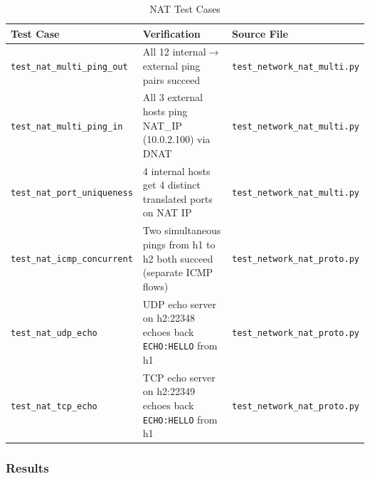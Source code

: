 \documentclass[12pt,a4paper]{article}
\begin{document}
\begin{table}[H]
\centering
\begin{tabular}{@{}p{5cm}p{4.5cm}p{4cm}@{}}
\toprule
\textbf{Test Case} & \textbf{Verification} & \textbf{Source File} \\
\midrule
\texttt{test\_nat\_multi\_ping\_out} & All 12 internal$\rightarrow$external ping pairs succeed & \texttt{test\_network\_nat\_multi.py} \\
\texttt{test\_nat\_multi\_ping\_in} & All 3 external hosts ping NAT_IP (10.0.2.100) via DNAT & \texttt{test\_network\_nat\_multi.py} \\
\texttt{test\_nat\_port\_uniqueness} & 4 internal hosts get 4 distinct translated ports on NAT IP & \texttt{test\_network\_nat\_multi.py} \\
\texttt{test\_nat\_icmp\_concurrent} & Two simultaneous pings from h1 to h2 both succeed (separate ICMP flows) & \texttt{test\_network\_nat\_proto.py} \\
\texttt{test\_nat\_udp\_echo} & UDP echo server on h2:22348 echoes back \texttt{ECHO:HELLO} from h1 & \texttt{test\_network\_nat\_proto.py} \\
\texttt{test\_nat\_tcp\_echo} & TCP echo server on h2:22349 echoes back \texttt{ECHO:HELLO} from h1 & \texttt{test\_network\_nat\_proto.py} \\
\bottomrule
\end{tabular}
\caption{NAT Test Cases}
\end{table}

\subsubsection{Results}

\begin{center}
\end{center}

\end{document}
